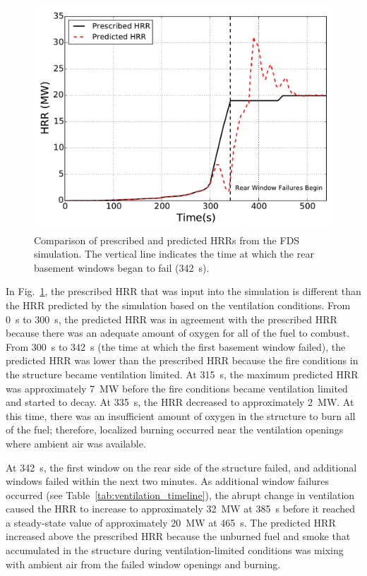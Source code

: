 \documentclass[12pt,oneside]{book}
\begin{document}
\begin{figure}[!ht]
\includegraphics[width=5.5in]{../Figures/Fire_HRR_w_FDS}
\caption[Predicted HRR vs. time from the FDS simulation.]
{Comparison of prescribed and predicted HRRs from the FDS simulation. The vertical line indicates the time at which the rear basement windows began to fail (342~s).}
\label{fig:hrr_w_fds}
\end{figure}


\clearpage


In Fig.~\ref{fig:hrr_w_fds}, the prescribed HRR that was input into the simulation is different than the HRR predicted by the simulation based on the ventilation conditions. From 0~s to 300~s, the predicted HRR was in agreement with the prescribed HRR because there was an adequate amount of oxygen for all of the fuel to combust. From 300~s to 342~s (the time at which the first basement window failed), the predicted HRR was lower than the prescribed HRR because the fire conditions in the structure became ventilation limited. At 315~s, the maximum predicted HRR was approximately 7~MW before the fire conditions became ventilation limited and started to decay. At 335~s, the HRR decreased to approximately 2~MW. At this time, there was an insufficient amount of oxygen in the structure to burn all of the fuel; therefore, localized burning occurred near the ventilation openings where ambient air was available.

At 342~s, the first window on the rear side of the structure failed, and additional windows failed within the next two minutes. As additional window failures occurred (see Table~\ref{tab:ventilation_timeline}), the abrupt change in ventilation caused the HRR to increase to approximately 32~MW at 385~s before it reached a steady-state value of approximately 20~MW at 465~s. The predicted HRR increased above the prescribed HRR because the unburned fuel and smoke that accumulated in the structure during ventilation-limited conditions was mixing with ambient air from the failed window openings and burning.
\end{document}
